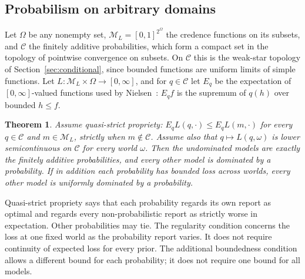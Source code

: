 \documentclass[11pt]{article}
\newtheorem{theorem}{Theorem}[section]
\theoremstyle{definition}
\theoremstyle{remark}
\newcommand{\M}{\mathcal M}
\newcommand{\C}{\mathcal C}
\begin{document}
\subsection{Probabilism on arbitrary domains}\label{sec:nielsen} Let $\Omega$ be any nonempty set, $\M_L=[0,1]^{2^\Omega}$ the credence functions on its subsets, and $\C$ the finitely additive probabilities, which form a compact set in the topology of pointwise convergence on subsets. On $\C$ this is the weak-star topology of Section~\ref{sec:conditional}, since bounded functions are uniform limits of simple functions. Let $L:\M_L\times\Omega\to[0,\infty]$, and for $q\in\C$ let $E_q$ be the expectation of $[0,\infty]$-valued functions used by Nielsen~\cite[Appendix A]{Nielsen}: $E_qf$ is the supremum of $q(h)$ over bounded $h\le f$. 
\begin{theorem}\label{thm:nielsen}
Assume \emph{quasi-strict propriety}: $E_qL(q,\cdot)\le E_qL(m,\cdot)$ for every $q\in\C$ and $m\in\M_L$, strictly when $m\notin\C$. Assume also that $q\mapsto L(q,\omega)$ is lower semicontinuous on $\C$ for every world $\omega$. Then the undominated models are exactly the finitely additive probabilities, and every other model is dominated by a probability. If in addition each probability has bounded loss across worlds, every other model is uniformly dominated by a probability.
\end{theorem}
Quasi-strict propriety says that each probability regards its own report as optimal and regards every non-probabilistic report as strictly worse in expectation. Other probabilities may tie. The regularity condition concerns the loss at one fixed world as the probability report varies. It does not require continuity of expected loss for every prior. The additional boundedness condition allows a different bound for each probability; it does not require one bound for all models.
\end{document}
